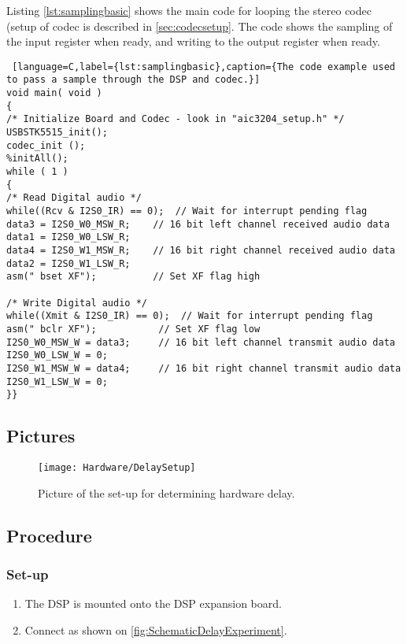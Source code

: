 Listing \ref{lst:samplingbasic} shows the main code for looping the stereo codec (setup of codec is described in \autoref{sec:codecsetup}. The code shows the sampling of the input register when ready, and writing to the output register when ready. 

\begin{lstlisting} [language=C,label={lst:samplingbasic},caption={The code example used to pass a sample through the DSP and codec.}]
void main( void )
{
/* Initialize Board and Codec - look in "aic3204_setup.h" */
USBSTK5515_init();
codec_init ();
%initAll();
while ( 1 )
{
/* Read Digital audio */
while((Rcv & I2S0_IR) == 0);  // Wait for interrupt pending flag
data3 = I2S0_W0_MSW_R;    // 16 bit left channel received audio data
data1 = I2S0_W0_LSW_R;
data4 = I2S0_W1_MSW_R;    // 16 bit right channel received audio data
data2 = I2S0_W1_LSW_R;
asm(" bset XF");	  	  // Set XF flag high

/* Write Digital audio */
while((Xmit & I2S0_IR) == 0);  // Wait for interrupt pending flag
asm(" bclr XF");		   // Set XF flag low
I2S0_W0_MSW_W = data3;     // 16 bit left channel transmit audio data
I2S0_W0_LSW_W = 0;
I2S0_W1_MSW_W = data4;     // 16 bit right channel transmit audio data
I2S0_W1_LSW_W = 0;
}}
\end{lstlisting}


\subsection{Pictures}

\begin{figure}[H]
	\centering
\texttt{[image: Hardware/DelaySetup]}
	\caption{Picture of the set-up for {}determining hardware delay.}
	\label{fig:DelayExperimentSetup}
\end{figure}

\subsection{Procedure}
\subsubsection{Set-up}
\begin{enumerate}
	\item The DSP is mounted onto the DSP expansion board.
	\item Connect as shown on \autoref{fig:SchematicDelayExperiment}.
\end{enumerate}

